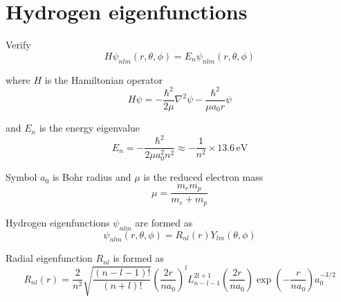 

\section*{Hydrogen eigenfunctions}

Verify
\begin{equation*}
H\psi_{nlm}(r,\theta,\phi)=E_n\psi_{nlm}(r,\theta,\phi)
\end{equation*}

where $H$ is the Hamiltonian operator
\begin{equation*}
H\psi=-\frac{\hbar^2}{2\mu}\nabla^2\psi-\frac{\hbar^2}{\mu a_0r}\psi
\end{equation*}

and $E_n$ is the energy eigenvalue
\begin{equation*}
E_n=-\frac{\hbar^2}{2\mu a_0^2n^2}
\approx-\frac{1}{n^2}\times13.6\,\text{eV}
\end{equation*}

Symbol $a_0$ is Bohr radius and $\mu$ is the reduced electron mass
\begin{equation*}
\mu=\frac{m_e m_p}{m_e+m_p}
\end{equation*}

Hydrogen eigenfunctions $\psi_{nlm}$ are formed as
\begin{equation*}
\psi_{nlm}(r,\theta,\phi)=R_{nl}(r)Y_{lm}(\theta,\phi)
\end{equation*}

\iffalse
Quantum number $n$ is the principal quantum number.
\begin{equation*}
n=1,2,3,\ldots
\end{equation*}

Quantum number $l$ is the angular momentum quantum number.
\begin{equation*}
l=0,1,\ldots,n-1
\end{equation*}

Quantum number $m$ is the magnetic quantum number.
\begin{equation*}
m=-l,\ldots,0,\ldots,l
\end{equation*}
\fi

Radial eigenfunction $R_{nl}$ is formed as
\begin{equation*}
R_{nl}(r)=
\frac{2}{n^2}
\sqrt{\frac{(n-l-1)!}{(n+l)!}}
\left(\frac{2r}{na_0}\right)^l
L_{n-l-1}^{2l+1}\left(\frac{2r}{na_0}\right)
\exp\left(-\frac{r}{na_0}\right)
a_0^{-3/2}
\end{equation*}

